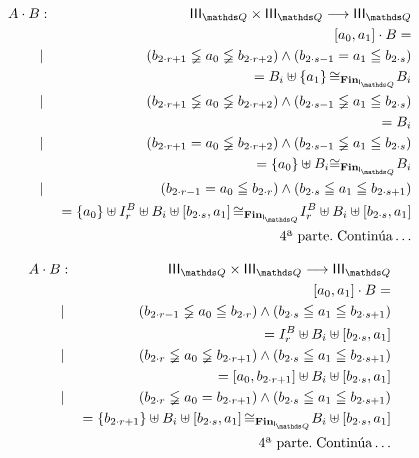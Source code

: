 \documentclass[final,12pt,a4paper,twoside,fleqn]{extbook}
\newcommand{\fromto}{\ensuremath{\longrightarrow}}
\newcommand{\set}[1]{\ensuremath{\left\lbrace{#1}\right\rbrace}}
\theoremstyle{definition}
\theoremstyle{remark}
\begin{document}
\begin{eqnarray}
A \cdot B &:& \IIIQ \times \IIIQ \fromto \IIIQ\\
&&\left[a_0,a_1\right] \cdot B =\\
&|&{\left(b_{2\cdot r + 1} \lneqq a_0 \lneqq b_{2\cdot
r + 2}\right)}\land{\left(b_{2\cdot s-1} = a_1 \leqq b_{2\cdot
s}\right)}\\
\qquad&&= B_i \uplus \set{a_1} {\cong}_{\mathbf{Fin}_{\IQ}}
B_i\\
&|&{\left(b_{2\cdot r + 1} \lneqq a_0 \lneqq b_{2\cdot
r + 2}\right)}\land{\left(b_{2\cdot s-1} \lneqq a_1 \leqq b_{2\cdot
s}\right)}\\
\qquad&&= B_i\\
&|&{\left(b_{2\cdot r + 1} = a_0 \lneqq b_{2\cdot
r + 2}\right)}\land{\left(b_{2\cdot s-1} \lneqq a_1 \leqq b_{2\cdot
s}\right)}\\
\qquad&&= \set{a_0} \uplus B_i {\cong}_{\mathbf{Fin}_{\IQ}} B_i\\
&|&{\left(b_{2\cdot r-1} = a_0 \leqq b_{2\cdot
r}\right)}\land{\left(b_{2\cdot s} \leqq a_1 \leqq b_{2\cdot
s + 1}\right)}\\
\qquad&&= \set{a_0} \uplus I_r^B \uplus B_i \uplus \left[b_{2\cdot 
s},a_1\right]
{\cong}_{\mathbf{Fin}_{\IQ}} I_r^B \uplus B_i \uplus \left[b_{2\cdot 
s},a_1\right]\\ \nonumber
&&\text{4ª parte.}\;\text{Continúa}\ldots
\end{eqnarray}



\begin{eqnarray}
A \cdot B &:& \IIIQ \times \IIIQ \fromto \IIIQ\\
&&\left[a_0,a_1\right] \cdot B =\\
&|&{\left(b_{2\cdot r-1} \lneqq a_0 \leqq b_{2\cdot
r}\right)}\land{\left(b_{2\cdot s} \leqq a_1 \leqq b_{2\cdot
s + 1}\right)}\\
\qquad&&= I_r^B \uplus B_i \uplus \left[b_{2\cdot 
s},a_1\right]\\
&|&{\left(b_{2\cdot r} \lneqq a_0 \lneqq b_{2\cdot
r + 1}\right)}\land{\left(b_{2\cdot s} \leqq a_1 \leqq b_{2\cdot
s + 1}\right)}\\
\qquad&&= \left[a_0,b_{{2\cdot r}+1}\right] \uplus B_i \uplus \left[b_{2\cdot 
s},a_1\right]\\
&|&{\left(b_{2\cdot r} \lneqq a_0 = b_{2\cdot
r + 1}\right)}\land{\left(b_{2\cdot s} \leqq a_1 \leqq b_{2\cdot
s + 1}\right)}\\
\qquad&&= \set{b_{{2\cdot r}+1}} \uplus B_i \uplus \left[b_{2\cdot 
s},a_1\right] {\cong}_{\mathbf{Fin}_{\IQ}} B_i \uplus \left[b_{2\cdot 
s},a_1\right]\\ \nonumber
&&\text{4ª parte.}\;\text{Continúa}\ldots
\end{eqnarray}
\end{document}
